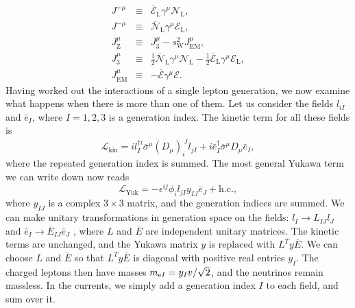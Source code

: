 \begin{eqnarray}
J^{+\mu} &\equiv & \overline{\mathcal{E}}_{\mathrm{L}} \gamma^{\mu} \mathcal{N}_{\mathrm{L}} ,\nonumber \\
J^{-\mu} &\equiv & \overline{\mathcal{N}}_{\mathrm{L}} \gamma^{\mu} \mathcal{E}_{\mathrm{L}} ,\nonumber \\
J_{\mathrm{Z}}^{\mu} &\equiv & J_3^{\mu} - s_{\mathrm{W}}^2 J^{\mu}_{\mathrm{EM}} ,\nonumber \\
J_3^{\mu} &\equiv & \frac{1}{2}\overline{\mathcal{N}}_{\mathrm{L}} \gamma^{\mu} \mathcal{N}_{\mathrm{L}} - \frac{1}{2}\overline{\mathcal{E}}_{\mathrm{L}} \gamma^{\mu} \mathcal{E}_{\mathrm{L}} ,\nonumber \\
J^{\mu}_{\mathrm{EM}} &\equiv &  -\overline{\mathcal{E}} \gamma^{\mu} \mathcal{E} .\nonumber
\end{eqnarray}
Having worked out the interactions of a single lepton generation, we now examine what happens when there is more than one of them. 
Let us consider the fields $l_{iI}$ and $\bar{e}_{I}$, where $I=1,2,3$ is a generation index. The kinetic term for all these fields is
\[\mathcal{L}_{\mathrm{kin}} = il^{\dagger i}_I \overline{\sigma}^{\mu}(D_{\mu})_{i}^{\phantom{i}j} l_{jI} + i\bar{e}_I^{\dagger}\overline{\sigma}^{\mu} D_{\mu}\bar{e}_I,\]
where the repeated generation index is summed. The most general Yukawa term we can write down now reads
\[\mathcal{L}_{\mathrm{Yuk}} = -\epsilon^{ij}\phi_i l_{jI}y_{IJ} \bar{e}_{J} + \mathrm{h.c.},\]
where $y_{IJ}$ is a complex $3 \times 3$ matrix, and the generation indices are summed.
We can make unitary transformations in generation space on the fields: $l_I \to L_{IJ} l_J$ and $\bar{e}_I \to \overline{E}_{IJ}\bar{e}_J$ , where $L$ and $\overline{E}$ are independent unitary matrices.
The kinetic terms are unchanged, and the Yukawa matrix $y$ is replaced with $L^T y \overline{E} $. We can choose $L$ and $\overline{E}$ so that $L^T y \overline{E}$ is diagonal with positive real entries $y_I$. The charged leptons then have masses $m_{{\rm e}I} = {y_Iv}/ {\sqrt{2}}$, and the neutrinos remain massless. In the currents, we simply add a generation index $I$ to each field, and sum over it.

